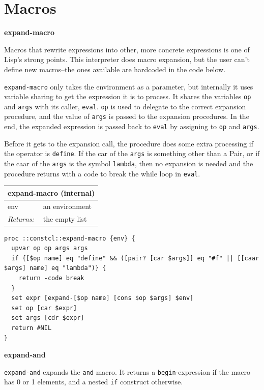 \documentclass[twoside,9pt]{report}
\begin{document}
\section{Macros}
\label{macros}

\textbf{expand-macro}


Macros that rewrite expressions into other, more concrete expressions is one of Lisp's strong points. This interpreter does macro expansion, but the user can't define new macros--the ones available are hardcoded in the code below.


\texttt{expand-macro} only takes the environment as a parameter, but internally it uses variable sharing to get the expression it is to process. It shares the variables \texttt{op} and \texttt{args} with its caller, \texttt{eval}. \texttt{op} is used to delegate to the correct expansion procedure, and the value of \texttt{args} is passed to the expansion procedures. In the end, the expanded expression is passed back to \texttt{eval} by assigning to \texttt{op} and \texttt{args}.


Before it gets to the expansion call, the procedure does some extra processing if the operator is \texttt{define}. If the car of the \texttt{args} is something other than a Pair, or if the caar of the \texttt{args} is the symbol \texttt{lambda}, then no expansion is needed and the procedure returns with a code to break the while loop in \texttt{eval}.

\begin{tabular}{ |l l| }
\hline
\multicolumn{2}{|l|}{expand-macro (internal)} \\
\hline
env & an environment \\
\textit{Returns:} & the empty list \\
\hline
\end{tabular}

\noindent\makebox[\linewidth]{\rule{\linewidth}{0.4pt}}
\begin{lstlisting}
proc ::constcl::expand-macro {env} {
  upvar op op args args
  if {[$op name] eq "define" && ([pair? [car $args]] eq "#f" || [[caar $args] name] eq "lambda")} {
    return -code break
  }
  set expr [expand-[$op name] [cons $op $args] $env]
  set op [car $expr]
  set args [cdr $expr]
  return #NIL
}
\end{lstlisting}
\noindent\makebox[\linewidth]{\rule{\linewidth}{0.4pt}}

\textbf{expand-and}


\texttt{expand-and} expands the \texttt{and} macro. It returns a \texttt{begin}-expression if the macro has 0 or 1 elements, and a nested \texttt{if} construct otherwise.
\end{document}
